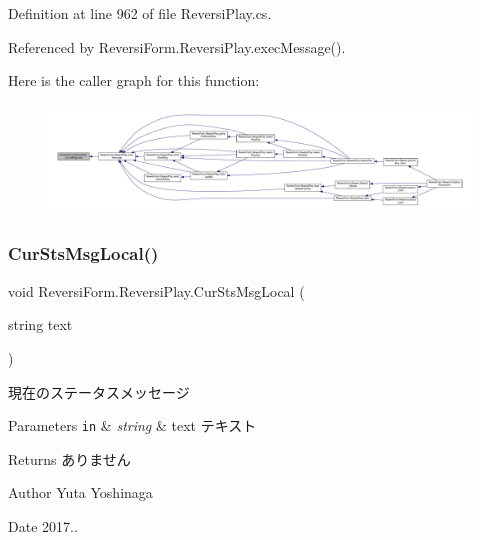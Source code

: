 Definition at line 962 of file Reversi\+Play.\+cs.



Referenced by Reversi\+Form.\+Reversi\+Play.\+exec\+Message().

Here is the caller graph for this function\+:\nopagebreak
\begin{figure}[H]
\begin{center}
\leavevmode
\includegraphics[width=350pt]{class_reversi_form_1_1_reversi_play_a9b4d5bd01207c648cc80f018fbba9519_icgraph}
\end{center}
\end{figure}
\mbox{\label{class_reversi_form_1_1_reversi_play_af2e634847166a90c717aa19ae8aee6b7}} 
\subsubsection{\texorpdfstring{Cur\+Sts\+Msg\+Local()}{CurStsMsgLocal()}}
{\footnotesize\ttfamily void Reversi\+Form.\+Reversi\+Play.\+Cur\+Sts\+Msg\+Local (\begin{DoxyParamCaption}\item[{string}]{text }\end{DoxyParamCaption})\hspace{0.3cm}{\ttfamily [private]}}



現在のステータスメッセージ 


\begin{DoxyParams}[1]{Parameters}
\mbox{\tt in}  & {\em string} & text テキスト \\
\hline
\end{DoxyParams}
\begin{DoxyReturn}{Returns}
ありません 
\end{DoxyReturn}
\begin{DoxyAuthor}{Author}
Yuta Yoshinaga 
\end{DoxyAuthor}
\begin{DoxyDate}{Date}
2017.. 
\end{DoxyDate}


